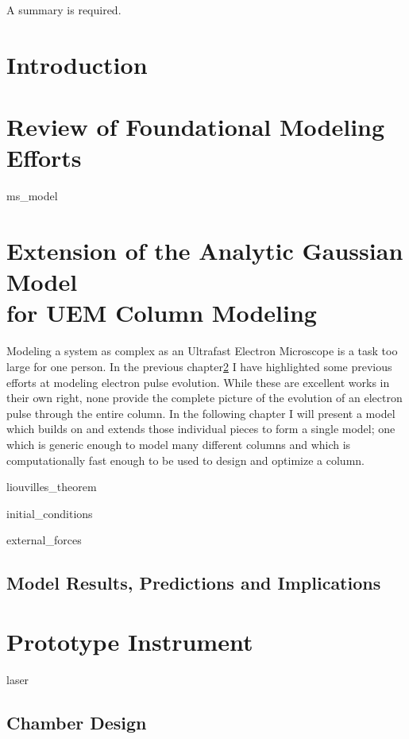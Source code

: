 \documentclass{uicthesi}
\begin{document}
\summary
A summary is required.

\chapter{Introduction}

\chapter{Review of Foundational Modeling Efforts} \label{chap:previous_models}

  {ms_model}

\chapter{Extension of the Analytic Gaussian Model\\for UEM Column Modeling}

Modeling a system as complex as an Ultrafast Electron Microscope is a task too large for one person.
In the previous chapter\ref{chap:previous_models} I have highlighted some previous efforts at modeling electron pulse evolution.
While these are excellent works in their own right, none provide the complete picture of the evolution of an electron pulse through the entire column.
In the following chapter I will present a model which builds on and extends those individual pieces to form a single model; one which is generic enough to model many different columns and which is computationally fast enough to be used to design and optimize a column.

  {liouvilles_theorem}

  {initial_conditions}

  {external_forces}

\section{Model Results, Predictions and Implications} \label{sec:model_results}

\chapter{Prototype Instrument}

  {laser}

\section{Chamber Design}
\end{document}
